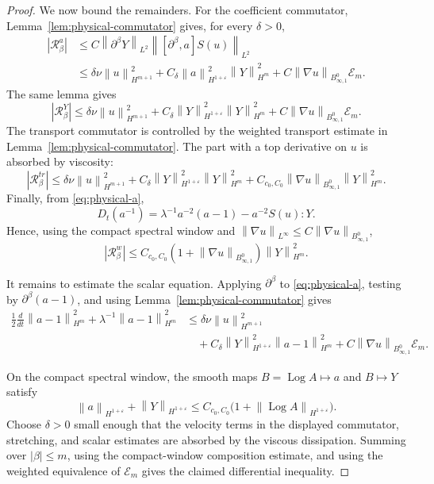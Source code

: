 \documentclass[11pt]{article}
\newcommand{\Log}{\operatorname{Log}}
\newcommand{\calE}{\mathcal E}
\newcommand{\calR}{\mathcal R}
\newcommand{\eps}{\varepsilon}
\newcommand{\norm}[1]{\left\lVert #1\right\rVert}
\newcommand{\Besov}{B^0_{\infty,1}}
\begin{document}
\begin{proof}
We now bound the remainders.  For the coefficient commutator,
Lemma~\ref{lem:physical-commutator} gives, for every \(\delta>0\),
\[
\begin{aligned}
  |\calR_\beta^{a}|
  &\le C\norm{\partial^\beta Y}_{L^2}
       \norm{[\partial^\beta,a]S(u)}_{L^2}  \\
  &\le \delta\nu\norm{u}_{H^{m+1}}^2
      +C_\delta\norm{a}_{H^{1+\eps}}^2\norm{Y}_{H^m}^2
      +C\norm{\nabla u}_{\Besov}\calE_m .
\end{aligned}
\label{eq:a-commutator-remainder}
\]
The same lemma gives
\[
  |\calR_\beta^{Y}|
  \le \delta\nu\norm{u}_{H^{m+1}}^2
      +C_\delta\norm{Y}_{H^{1+\eps}}^2\norm{Y}_{H^m}^2
      +C\norm{\nabla u}_{\Besov}\calE_m .
  \label{eq:Y-stretching-remainder}
\]
The transport commutator is controlled by the weighted transport estimate in
Lemma~\ref{lem:physical-commutator}.  The part with a top derivative on \(u\)
is absorbed by viscosity:
\[
  |\calR_\beta^{tr}|
  \le \delta\nu\norm{u}_{H^{m+1}}^2
      +C_\delta\norm{Y}_{H^{1+\eps}}^2\norm{Y}_{H^m}^2
      +C_{c_0,C_0}\norm{\nabla u}_{\Besov}\norm{Y}_{H^m}^2 .
  \label{eq:Y-transport-remainder}
\]
Finally, from \eqref{eq:physical-a},
\[
  D_t(a^{-1})=\lambda^{-1}a^{-2}(a-1)-a^{-2}S(u):Y .
\]
Hence, using the compact spectral window and
\(\norm{\nabla u}_{L^\infty}\le C\norm{\nabla u}_{\Besov}\),
\[
  |\calR_\beta^w|
  \le C_{c_0,C_0}\left(1+\norm{\nabla u}_{\Besov}\right)
      \norm{Y}_{H^m}^2 .
  \label{eq:weight-remainder}
\]

It remains to estimate the scalar equation.  Applying \(\partial^\beta\) to
\eqref{eq:physical-a}, testing by \(\partial^\beta(a-1)\), and using
Lemma~\ref{lem:physical-commutator} gives
\[
\begin{aligned}
  \frac12\frac{d}{dt}\norm{a-1}_{H^m}^2
  +\lambda^{-1}\norm{a-1}_{H^m}^2
  &\le \delta\nu\norm{u}_{H^{m+1}}^2  \\
  &\quad+C_\delta\norm{Y}_{H^{1+\eps}}^2\norm{a-1}_{H^m}^2
  +C\norm{\nabla u}_{\Besov}\calE_m .
\end{aligned}
\label{eq:a-high-order}
\]

On the compact spectral window, the smooth maps
\(B=\Log A\mapsto a\) and \(B\mapsto Y\) satisfy
\[
  \norm{a}_{H^{1+\eps}}+\norm{Y}_{H^{1+\eps}}
  \le C_{c_0,C_0}\bigl(1+\norm{\Log A}_{H^{1+\eps}}\bigr).
  \label{eq:window-log-composition}
\]
Choose \(\delta>0\) small enough that the velocity terms in the displayed commutator, stretching, and scalar estimates are absorbed by the viscous dissipation.  Summing over \(|\beta|\le m\), using the compact-window composition estimate, and using the weighted equivalence of \(\calE_m\) gives the claimed differential inequality.
\end{proof}
\end{document}

